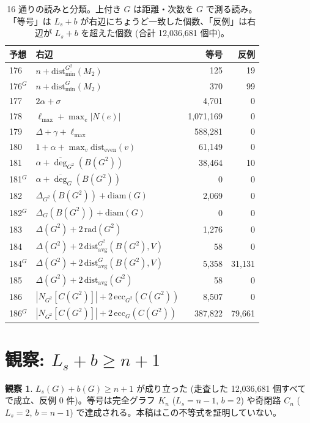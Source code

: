 \documentclass[paper=a4,fontsize=10.5pt,jafontsize=10.5pt]{jlreq}
\theoremstyle{plain}
\theoremstyle{definition}
\newtheorem{observation}[theorem]{観察}
\begin{document}
\begin{table}[htbp]
\centering
\small
\caption{16 通りの読みと分類。上付き $G$ は距離・次数を $G$ で測る読み。
「等号」は $L_s + b$ が右辺にちょうど一致した個数、「反例」は右辺が
$L_s + b$ を超えた個数 (合計 12,036,681 個中)。}
\label{tab:readings}
\begin{tabular}{llrr}
\toprule
予想 & 右辺 & 等号 & 反例 \\
\midrule
176 & $n + \mathrm{dist}_{\min}^{G^2}(M_2)$ & 125 & 19 \\
176${}^{G}$ & $n + \mathrm{dist}_{\min}^{G}(M_2)$ & 370 & 99 \\
177 & $2\alpha + \sigma$ & 4,701 & 0 \\
178 & $\ell_{\max} + \max_e |N(e)|$ & 1,071,169 & 0 \\
179 & $\Delta + \gamma + \ell_{\max}$ & 588,281 & 0 \\
180 & $1 + \alpha + \max_v \mathrm{dist}_{\mathrm{even}}(v)$ & 61,149 & 0 \\
181 & $\alpha + \overline{\deg}_{G^2}(B(G^2))$ & 38,464 & 10 \\
181${}^{G}$ & $\alpha + \overline{\deg}_{G}(B(G^2))$ & 0 & 0 \\
182 & $\Delta_{G^2}(B(G^2)) + \mathrm{diam}(G)$ & 2,069 & 0 \\
182${}^{G}$ & $\Delta_{G}(B(G^2)) + \mathrm{diam}(G)$ & 0 & 0 \\
183 & $\Delta(G^2) + 2\,\mathrm{rad}(G^2)$ & 1,276 & 0 \\
184 & $\Delta(G^2) + 2\,\mathrm{dist}_{\mathrm{avg}}^{G^2}(B(G^2), V)$ & 58 & 0 \\
184${}^{G}$ & $\Delta(G^2) + 2\,\mathrm{dist}_{\mathrm{avg}}^{G}(B(G^2), V)$ & 5,358 & 31,131 \\
185 & $\Delta(G^2) + 2\,\mathrm{dist}_{\mathrm{avg}}(G^2)$ & 58 & 0 \\
186 & $|N_{G^2}[C(G^2)]| + 2\,\mathrm{ecc}_{G^2}(C(G^2))$ & 8,507 & 0 \\
186${}^{G}$ & $|N_{G^2}[C(G^2)]| + 2\,\mathrm{ecc}_{G}(C(G^2))$ & 387,822 & 79,661 \\
\bottomrule
\end{tabular}
\end{table}

\section{観察: $L_s + b \ge n + 1$}\label{sec:o1}

\begin{observation}\label{obs:o1}
$L_s(G) + b(G) \ge n + 1$ が成り立った (走査した 12,036,681 個すべてで成立、反例 0 件)。等号は完全グラフ $K_n$ ($L_s = n-1$, $b = 2$) や奇閉路 $C_n$
($L_s = 2$, $b = n-1$) で達成される。本稿はこの不等式を証明していない。
\end{observation}
\end{document}
